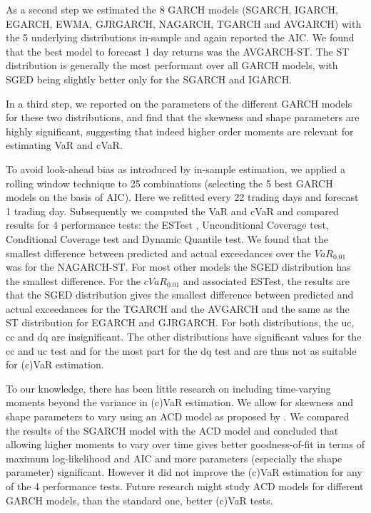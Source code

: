 \documentclass[a4paper, nobind]{templates/ociamthesis}
\begin{document}
As a second step we estimated the 8 GARCH models (SGARCH, IGARCH, EGARCH, EWMA, GJRGARCH, NAGARCH, TGARCH and AVGARCH) with the 5 underlying distributions in-sample and again reported the AIC. We found that the best model to forecast 1 day returns was the AVGARCH-ST. The ST distribution is generally the most performant over all GARCH models, with SGED being slightly better only for the SGARCH and IGARCH.

In a third step, we reported on the parameters of the different GARCH models for these two distributions, and find that the skewness and shape parameters are highly significant, suggesting that indeed higher order moments are relevant for estimating VaR and cVaR.

To avoid look-ahead bias as introduced by in-sample estimation, we applied a rolling window technique to 25 combinations (selecting the 5 best GARCH models on the basis of AIC). Here we refitted every 22 trading days and forecast 1 trading day. Subsequently we computed the VaR and cVaR and compared results for 4 performance tests: the ESTest \textcite{Mcneil}, Unconditional Coverage test, Conditional Coverage test and Dynamic Quantile test. We found that the smallest difference between predicted and actual exceedances over the \(VaR_{0.01}\) was for the NAGARCH-ST. For most other models the SGED distribution has the smallest difference. For the \(cVaR_{0.01}\) and associated ESTest, the results are that the SGED distribution gives the smallest difference between predicted and actual exceedances for the TGARCH and the AVGARCH and the same as the ST distribution for EGARCH and GJRGARCH. For both distributions, the uc, cc and dq are insignificant. The other distributions have significant values for the cc and uc test and for the most part for the dq test and are thus not as suitable for (c)VaR estimation.

To our knowledge, there has been little research on including time-varying moments beyond the variance in (c)VaR estimation. We allow for skewness and shape parameters to vary using an ACD model as proposed by \textcite{Ghalanos}. We compared the results of the SGARCH model with the ACD model and concluded that allowing higher moments to vary over time gives better goodness-of-fit in terms of maximum log-likelihood and AIC and more parameters (especially the shape parameter) significant. However it did not improve the (c)VaR estimation for any of the 4 performance tests. Future research might study ACD models for different GARCH models, than the standard one, better (c)VaR tests.
\end{document}
